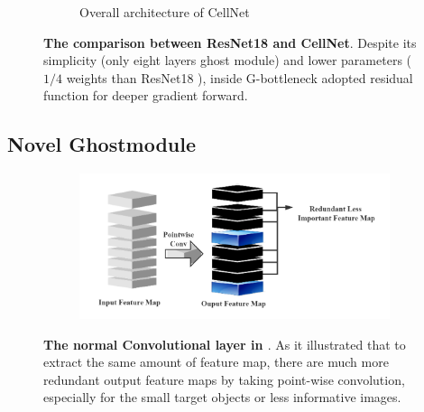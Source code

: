 \begin{figure}[h]
\begin{center}
\begin{subfigure}[t]{0.49\textwidth}
			\caption{Overall architecture of CellNet}
			\label{fig:cellnet}
		\end{subfigure}
	\end{center}
	\caption{\textbf{The comparison between ResNet18 \cite{20} and CellNet}. Despite its simplicity (only eight layers ghost module) and lower parameters ( $1/4$ weights than ResNet18 \cite{20}), inside G-bottleneck adopted residual function for deeper gradient forward.}
	\label{fig:3.6}
\end{figure}








\subsection{Novel Ghostmodule} %
\label{sub:amet}

\begin{figure}[h]
	\begin{center}
		\begin{subfigure}[b]{\textwidth}
		    \centering
			\includegraphics[width=\textwidth]{thesis-template-master/images/normal conv.png}
			
			\label{fig:cellnet}
		\end{subfigure}
	\end{center}
	\caption{\textbf{The normal Convolutional layer in \cite{26}\cite{27}\cite{28}}. As it illustrated that to extract the same amount of feature map, there are much more redundant output feature maps by taking point-wise convolution, especially for the small target objects or less informative images.}
	\label{fig:3.7}
\end{figure}


